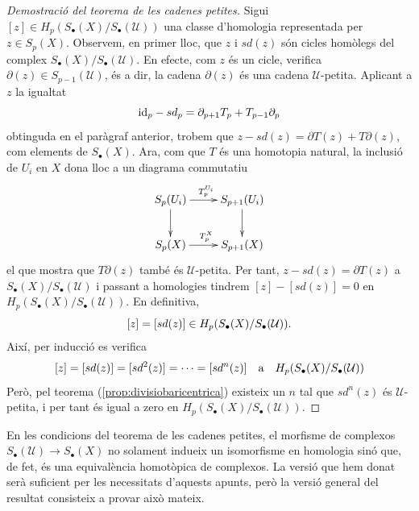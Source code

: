 \documentclass[../main.tex]{subfiles}
\begin{document}
\begin{enumerate}
\begin{proof}[Demostració del teorema de les cadenes petites]
    Sigui $[z]\in H_p(S_\bullet(X)/S_\bullet(\mathcal{U}))$ una classe d'homologia representada per $z\in S_p(X)$. Observem, en primer lloc, que $z$ i $sd(z)$ són cicles homòlegs del complex $S_\bullet(X)/S_\bullet(\mathcal{U})$. En efecte, com $z$ és un cicle, verifica $\partial(z) \in S_{p-1}(\mathcal{U})$, és a dir, la cadena $\partial(z)$ és una cadena $\mathcal{U}$-petita. Aplicant a $z$ la igualtat
    \begin{equation}
        \notag
        \mathrm{id}_p-sd_p = \partial_{p+1}T_p+T_{p-1}\partial_p
    \end{equation}
    obtinguda en el paràgraf anterior, trobem que $z-sd(z) = \partial T(z)+T\partial(z)$, com elements de $S_\bullet(X)$. Ara, com que $T$ és una homotopia natural, la inclusió de $U_i$ en $X$ dona lloc a un diagrama commutatiu
    \begin{equation}
        \notag
        \xymatrix{
        S_p(U_i)\ar[r]^{T_p^{U_i}}\ar[d] & S_{p+1}(U_i)\ar[d]\\
        S_p(X)\ar[r]^{T^X_p}& S_{p+1}(X)
        }
    \end{equation}
    el que mostra que $T\partial (z)$ també és $\mathcal{U}$-petita. Per tant, $z-sd(z) = \partial T(z)$ a $S_\bullet(X)/S_\bullet(\mathcal{U})$ i passant a homologies tindrem $[z]-[sd(z)] = 0$ en $H_p(S_\bullet(X)/S_\bullet(\mathcal{U}))$. En definitiva,
    \begin{equation}
        \notag
        [z] = [sd(z)]\in H_p(S_\bullet(X)/S_\bullet(\mathcal{U})).
    \end{equation}
    Així, per inducció es verifica
    \begin{equation}
        \notag
        [z] = [sd(z)] = [sd^2(z)] = \cdots = [sd^n(z)]\quad \text{a}\quad H_p(S_\bullet(X)/S_\bullet(\mathcal{U}))
    \end{equation}
    Però, pel teorema (\ref{prop:divisiobaricentrica}) existeix un $n$ tal que $sd^n(z)$ és $\mathcal{U}$-petita, i per tant és igual a zero en $H_p(S_\bullet(X)/S_\bullet(\mathcal{U}))$. 
    \end{proof}
\end{enumerate}

En les condicions del teorema de les cadenes petites, el morfisme de complexos $S_\bullet(\mathcal{U})\rightarrow S_\bullet(X)$ no solament indueix un isomorfisme en homologia sinó que, de fet, és una equivalència homotòpica de complexos. La versió que hem donat serà suficient per les necessitats d'aquests apunts, però la versió general del resultat consisteix a provar això mateix.
\end{document}
